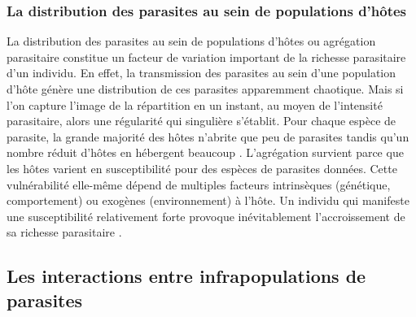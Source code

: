 \subsubsection{La distribution des parasites au sein de populations d'hôtes}
La distribution des parasites au sein de populations d'hôtes ou agrégation parasitaire 
constitue un facteur de variation important de la richesse parasitaire d'un individu. 
En effet, la transmission des parasites au sein d'une population d'hôte génère une 
distribution de ces parasites apparemment chaotique. Mais si l'on capture l'image de 
la répartition en un instant, au moyen de l'intensité parasitaire, alors une régularité 
qui singulière s'établit. Pour chaque espèce de parasite, la grande majorité des hôtes 
n'abrite que peu de parasites tandis qu'un nombre réduit d'hôtes en hébergent beaucoup 
. L'agrégation survient parce que les hôtes varient en susceptibilité 
pour des espèces de parasites données. Cette vulnérabilité elle-même dépend de 
multiples facteurs intrinsèques (génétique, comportement) ou exogènes (environnement) 
à l'hôte.  Un individu qui manifeste une susceptibilité relativement forte provoque 
inévitablement l'accroissement de sa richesse parasitaire .

\subsection{Les interactions entre infrapopulations de parasites}

